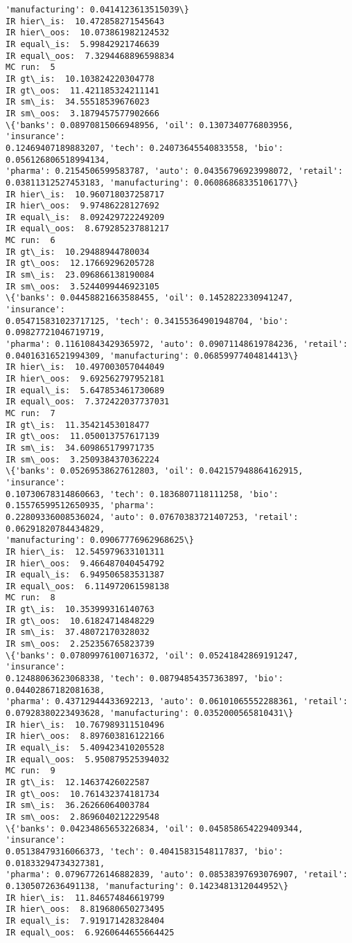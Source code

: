 \documentclass[11pt]{article}
\begin{document}
\begin{Verbatim}[commandchars=\\\{\},fontsize=\footnotesize]
'manufacturing': 0.0414123613515039\}
IR hier\_is:  10.472858271545643
IR hier\_oos:  10.073861982124532
IR equal\_is:  5.99842921746639
IR equal\_oos:  7.3294468896598834
MC run:  5
IR gt\_is:  10.103824220304778
IR gt\_oos:  11.421185324211141
IR sm\_is:  34.55518539676023
IR sm\_oos:  3.1879457577902666
\{'banks': 0.08970815066948956, 'oil': 0.1307340776803956, 'insurance':
0.12469407189883207, 'tech': 0.24073645540833558, 'bio': 0.056126806518994134,
'pharma': 0.2154506599583787, 'auto': 0.04356796923998072, 'retail':
0.03811312527453183, 'manufacturing': 0.06086868335106177\}
IR hier\_is:  10.960718037258717
IR hier\_oos:  9.97486228127692
IR equal\_is:  8.092429722249209
IR equal\_oos:  8.679285237881217
MC run:  6
IR gt\_is:  10.29488944780034
IR gt\_oos:  12.17669296205728
IR sm\_is:  23.096866138190084
IR sm\_oos:  3.5244099446923105
\{'banks': 0.04458821663588455, 'oil': 0.1452822330941247, 'insurance':
0.054715831023717125, 'tech': 0.34155364901948704, 'bio': 0.09827721046719719,
'pharma': 0.11610843429365972, 'auto': 0.09071148619784236, 'retail':
0.04016316521994309, 'manufacturing': 0.06859977404814413\}
IR hier\_is:  10.497003057044049
IR hier\_oos:  9.692562797952181
IR equal\_is:  5.647853461730689
IR equal\_oos:  7.372422037737031
MC run:  7
IR gt\_is:  11.35421453018477
IR gt\_oos:  11.050013757617139
IR sm\_is:  34.609865179971735
IR sm\_oos:  3.2509384370362224
\{'banks': 0.05269538627612803, 'oil': 0.042157948864162915, 'insurance':
0.10730678314860663, 'tech': 0.1836807118111258, 'bio': 0.15576599512650935, 'pharma':
0.22809336008536024, 'auto': 0.07670383721407253, 'retail': 0.06291820784434829,
'manufacturing': 0.09067776962968625\}
IR hier\_is:  12.545979633101311
IR hier\_oos:  9.466487040454792
IR equal\_is:  6.949506583531387
IR equal\_oos:  6.114972061598138
MC run:  8
IR gt\_is:  10.353999316140763
IR gt\_oos:  10.61824714848229
IR sm\_is:  37.48072170328032
IR sm\_oos:  2.252356765823739
\{'banks': 0.07809976100716372, 'oil': 0.05241842869191247, 'insurance':
0.12488063623068338, 'tech': 0.08794854357363897, 'bio': 0.04402867182081638,
'pharma': 0.43712944433692213, 'auto': 0.06101065552288361, 'retail':
0.07928380223493628, 'manufacturing': 0.0352000565810431\}
IR hier\_is:  10.767989311510496
IR hier\_oos:  8.897603816122166
IR equal\_is:  5.409423410205528
IR equal\_oos:  5.950879525394032
MC run:  9
IR gt\_is:  12.14637426022587
IR gt\_oos:  10.761432374181734
IR sm\_is:  36.26266064003784
IR sm\_oos:  2.8696040212229548
\{'banks': 0.04234865653226834, 'oil': 0.045858654229409344, 'insurance':
0.05138479316066373, 'tech': 0.40415831548117837, 'bio': 0.01833294734327381,
'pharma': 0.07967726146882839, 'auto': 0.08538397693076907, 'retail':
0.1305072636491138, 'manufacturing': 0.1423481312044952\}
IR hier\_is:  11.846574846619799
IR hier\_oos:  8.819680650273495
IR equal\_is:  7.919171428328404
IR equal\_oos:  6.9260644655664425

    \end{Verbatim}
\end{document}

